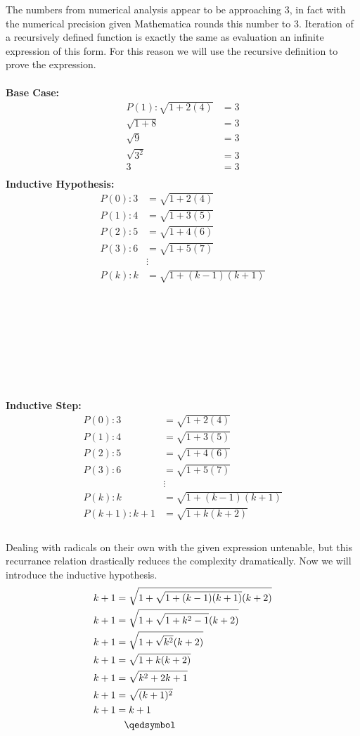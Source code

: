 \documentclass[12pt]{article}
\begin{document}
The numbers from numerical analysis appear to be approaching 3, in fact with the numerical precision given Mathematica rounds this number to 3. Iteration of a recursively defined function is exactly the same as evaluation an infinite expression of this form. For this reason we will use the recursive definition to prove the expression. \\\\
\textbf{Base Case:}\\
\begin{align*}
P(1):\sqrt{1+2(4)} &= 3\\
\sqrt{1+8} &= 3\\
\sqrt{9} &= 3\\
\sqrt{3^2} &= 3\\
3 &= 3\\
\end{align*}
\textbf{Inductive Hypothesis:}\\
\begin{align*}
P(0):3 &= \sqrt{1+2(4)}\\
P(1):4 &= \sqrt{1+3(5)}\\
P(2):5 &= \sqrt{1+4(6)}\\
P(3):6 &= \sqrt{1+5(7)}\\
&\vdots\\
P(k):k &= \sqrt{1+(k-1)(k+1)}\\
\end{align*}\\\\\\\\\\\\\\\\
\textbf{Inductive Step:}\\
\begin{align*}
P(0):3 &= \sqrt{1+2(4)}\\
P(1):4 &= \sqrt{1+3(5)}\\
P(2):5 &= \sqrt{1+4(6)}\\
P(3):6 &= \sqrt{1+5(7)}\\
&\vdots\\
P(k):k &= \sqrt{1+(k-1)(k+1)}\\
P(k + 1):k + 1 &= \sqrt{1+k(k+2)}\\
\end{align*}\\
Dealing with radicals on their own with the given expression untenable, but this recurrance relation drastically reduces the complexity dramatically. Now we will introduce the inductive hypothesis.\\
\begin{align*}
k + 1 &= \sqrt{1+\sqrt{1+(k-1)(k+1)}(k+2)}\\
k + 1 &= \sqrt{1+\sqrt{1+k^2-1}(k+2)}\\
k + 1 &= \sqrt{1+\sqrt{k^2}(k+2)}\\
k + 1 &= \sqrt{1+k(k+2)}\\
k + 1 &= \sqrt{k^2+2k+1}\\
k + 1 &= \sqrt{(k+1)^2}\\
k + 1 &= k+1\\
&\hspace{0.3cm}\qedsymbol
\end{align*}
\end{document}
